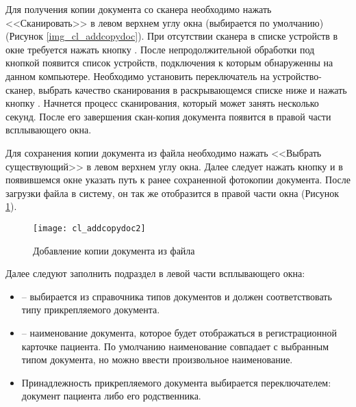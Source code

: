 {Для получения копии документа со сканера необходимо нажать <<Сканировать>> в левом верхнем углу окна (выбирается по умолчанию) (Рисунок \ref{img_cl_addcopydoc}). При отсутствии сканера в списке устройств в окне требуется нажать кнопку . После непродолжительной обработки под кнопкой появится список устройств, подключения к которым обнаруженны на данном компьютере. Необходимо установить переключатель на устройство-сканер, выбрать качество сканирования в раскрывающемся списке ниже и нажать кнопку . Начнется процесс сканирования, который может занять несколько секунд. После его завершения скан-копия документа появится в правой части всплывающего окна.

Для сохранения копии документа из файла необходимо нажать <<Выбрать существующий>> в левом верхнем углу окна. Далее следует нажать кнопку  и в появившемся окне указать путь к ранее сохраненной фотокопии документа. После загрузки файла в систему, он так же отобразится в правой части окна (Рисунок \ref{img_cl_addcopydoc2}).   

\begin{figure}[ht]\centering
 \texttt{[image: cl\_addcopydoc2]}
 \caption{Добавление копии документа из файла}
 \label{img_cl_addcopydoc2}
\end{figure} 

Далее следуют заполнить подраздел  в левой части всплывающего окна:
\begin{itemize}
 \item {} -- выбирается из справочника типов документов и должен соответствовать типу прикрепляемого документа.
 \item {} -- наименование документа, которое будет отображаться в регистрационной карточке пациента. По умолчанию наименование совпадает с выбранным типом документа, но можно ввести произвольное наименование.
 \item Принадлежность прикрепляемого документа выбирается переключателем: документ пациента либо его родственника.
\end{itemize}

}
